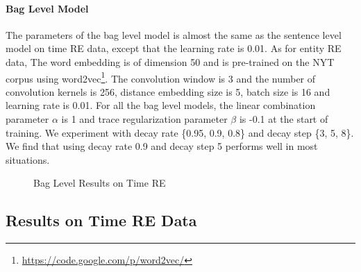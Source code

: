 \paragraph{Bag Level Model}
The parameters of the bag level model is almost the same as the sentence level model on time RE data, except that the learning rate is 0.01. As for entity RE data, The word embedding is of dimension 50 and is pre-trained on the NYT corpus using word2vec\footnote{\url{ https://code.google.com/p/word2vec/}}. The convolution window is 3 and the number of convolution kernels is 256, distance embedding size is 5, batch size is 16 and learning rate is 0.01. For all the bag level models, the linear combination parameter $\alpha$ is 1 and trace regularization parameter $\beta$ is -0.1 at the start of training. We experiment with decay rate \{0.95, 0.9, 0.8\} and decay step \{3, 5, 8\}. We find that using decay rate 0.9 and decay step 5 performs well in most situations.

\begin{figure}[htbp]
\centering
{}
\caption{Bag Level Results on Time RE}
\label{fig: results_on_luo}
\end{figure}

\subsection{Results on Time RE Data}

